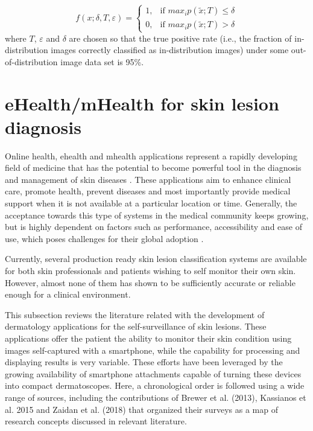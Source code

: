     \begin{equation}
        f(x; \delta, T, \varepsilon) = \begin{cases} 1, & \mbox{if } max_{i}p(\widetilde{x};T) \leq \delta \\ 0, & \mbox{if } max_{i}p(\widetilde{x};T) > \delta  \end{cases}
        \label{eqs:odin_threshold}
    \end{equation}
    where $T$, $\varepsilon$ and $\delta$ are chosen so that the true positive rate (i.e., the fraction of in-distribution images correctly classified as in-distribution images) under some out-of-distribution image data set is 95\%. \par
\section{eHealth/mHealth for skin lesion diagnosis}
\label{section:ehealth_mhealth}
    Online health, ehealth and mhealth applications represent a rapidly developing field of medicine that has the potential to become powerful tool in the diagnosis and management of skin diseases \cite{Jaworek-Korjakowska2018}. These applications aim to enhance clinical care, promote health, prevent diseases and most importantly provide medical support when it is not available at a particular location or time. Generally, the acceptance towards this type of systems in the medical community keeps growing, but is highly dependent on factors such as performance, accessibility and ease of use, which poses challenges for their global adoption \cite{?}. \par
    Currently, several production ready skin lesion classification systems are  available for both skin professionals and patients wishing to self monitor their own skin. However, almost none of them has shown to be sufficiently accurate or reliable enough for a clinical environment. \par 
    
    This subsection reviews the literature related with the development of dermatology applications for the self-surveillance of skin lesions. These applications offer the patient the ability to monitor their skin condition using images self-captured with a smartphone, while the capability for processing and displaying results is very variable. These efforts have been leveraged by the growing availability of smartphone attachments capable of turning these devices into compact dermatoscopes. Here, a chronological order is followed using a wide range of sources, including the contributions of Brewer et al. (2013), Kassianos et al. 2015 and Zaidan et al. (2018) that organized their surveys as a map of research concepts discussed in relevant literature. \par
    
